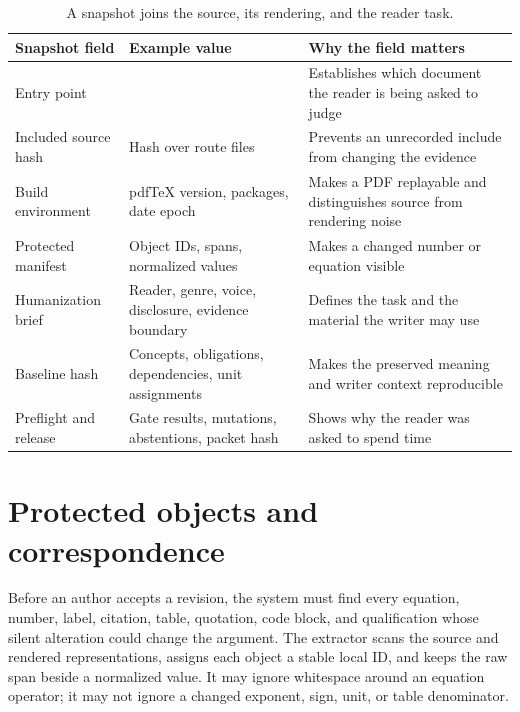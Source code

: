 \begin{table}[H]
\centering
\small
\begin{tabularx}{\textwidth}{@{}p{}L p{0.28\textwidth}@{}}
\toprule
Snapshot field & Example value & Why the field matters \\
\midrule
Entry point &  & Establishes which
document the reader is being asked to judge \\
Included source hash & Hash over route files & Prevents an unrecorded include
from changing the evidence \\
Build environment & pdfTeX version, packages, date epoch & Makes a PDF
replayable and distinguishes source from rendering noise \\
Protected manifest & Object IDs, spans, normalized values & Makes a changed
number or equation visible \\
Humanization brief & Reader, genre, voice, disclosure, evidence boundary &
Defines the task and the material the writer may use \\
Baseline hash & Concepts, obligations, dependencies, unit assignments & Makes the
preserved meaning and writer context reproducible \\
Preflight and release & Gate results, mutations, abstentions, packet hash &
Shows why the reader was asked to spend time \\
\bottomrule
\end{tabularx}
\caption{A snapshot joins the source, its rendering, and the reader task.}
\label{tab:snapshot-fields}
\end{table}

\section{Protected objects and correspondence}
\label{sec:architecture-protection}

Before an author accepts a revision, the system must find every equation,
number, label, citation, table, quotation, code block, and qualification whose
silent alteration could change the argument. The extractor scans the source
and rendered representations, assigns each object a stable local ID, and keeps
the raw span beside a normalized value. It may ignore whitespace around an
equation operator; it may not ignore a changed exponent, sign, unit, or table
denominator.

